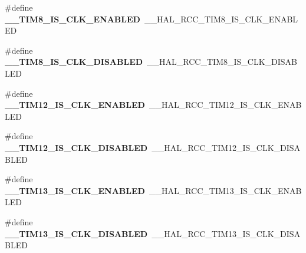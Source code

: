 \begin{DoxyCompactItemize}
\item 
\#define {\bfseries \+\_\+\+\_\+\+T\+I\+M8\+\_\+\+I\+S\+\_\+\+C\+L\+K\+\_\+\+E\+N\+A\+B\+L\+ED}~\+\_\+\+\_\+\+H\+A\+L\+\_\+\+R\+C\+C\+\_\+\+T\+I\+M8\+\_\+\+I\+S\+\_\+\+C\+L\+K\+\_\+\+E\+N\+A\+B\+L\+ED\hypertarget{group___h_a_l___r_c_c___aliased_gaf47e9207e83e8bfdd1ccedca25adb919}{}\label{group___h_a_l___r_c_c___aliased_gaf47e9207e83e8bfdd1ccedca25adb919}

\item 
\#define {\bfseries \+\_\+\+\_\+\+T\+I\+M8\+\_\+\+I\+S\+\_\+\+C\+L\+K\+\_\+\+D\+I\+S\+A\+B\+L\+ED}~\+\_\+\+\_\+\+H\+A\+L\+\_\+\+R\+C\+C\+\_\+\+T\+I\+M8\+\_\+\+I\+S\+\_\+\+C\+L\+K\+\_\+\+D\+I\+S\+A\+B\+L\+ED\hypertarget{group___h_a_l___r_c_c___aliased_gac644d31214f71a4b97900297ce75fbc3}{}\label{group___h_a_l___r_c_c___aliased_gac644d31214f71a4b97900297ce75fbc3}

\item 
\#define {\bfseries \+\_\+\+\_\+\+T\+I\+M12\+\_\+\+I\+S\+\_\+\+C\+L\+K\+\_\+\+E\+N\+A\+B\+L\+ED}~\+\_\+\+\_\+\+H\+A\+L\+\_\+\+R\+C\+C\+\_\+\+T\+I\+M12\+\_\+\+I\+S\+\_\+\+C\+L\+K\+\_\+\+E\+N\+A\+B\+L\+ED\hypertarget{group___h_a_l___r_c_c___aliased_ga0c5637eebc7a41d8e9d9d7ff1fb9deec}{}\label{group___h_a_l___r_c_c___aliased_ga0c5637eebc7a41d8e9d9d7ff1fb9deec}

\item 
\#define {\bfseries \+\_\+\+\_\+\+T\+I\+M12\+\_\+\+I\+S\+\_\+\+C\+L\+K\+\_\+\+D\+I\+S\+A\+B\+L\+ED}~\+\_\+\+\_\+\+H\+A\+L\+\_\+\+R\+C\+C\+\_\+\+T\+I\+M12\+\_\+\+I\+S\+\_\+\+C\+L\+K\+\_\+\+D\+I\+S\+A\+B\+L\+ED\hypertarget{group___h_a_l___r_c_c___aliased_gaaab56663d7cb19bdd60f4e3554b747c7}{}\label{group___h_a_l___r_c_c___aliased_gaaab56663d7cb19bdd60f4e3554b747c7}

\item 
\#define {\bfseries \+\_\+\+\_\+\+T\+I\+M13\+\_\+\+I\+S\+\_\+\+C\+L\+K\+\_\+\+E\+N\+A\+B\+L\+ED}~\+\_\+\+\_\+\+H\+A\+L\+\_\+\+R\+C\+C\+\_\+\+T\+I\+M13\+\_\+\+I\+S\+\_\+\+C\+L\+K\+\_\+\+E\+N\+A\+B\+L\+ED\hypertarget{group___h_a_l___r_c_c___aliased_ga8188c745262e4d7a49becae198d81bc0}{}\label{group___h_a_l___r_c_c___aliased_ga8188c745262e4d7a49becae198d81bc0}

\item 
\#define {\bfseries \+\_\+\+\_\+\+T\+I\+M13\+\_\+\+I\+S\+\_\+\+C\+L\+K\+\_\+\+D\+I\+S\+A\+B\+L\+ED}~\+\_\+\+\_\+\+H\+A\+L\+\_\+\+R\+C\+C\+\_\+\+T\+I\+M13\+\_\+\+I\+S\+\_\+\+C\+L\+K\+\_\+\+D\+I\+S\+A\+B\+L\+ED\hypertarget{group___h_a_l___r_c_c___aliased_ga166d8de45811451c662442f48bcfd5d2}{}\label{group___h_a_l___r_c_c___aliased_ga166d8de45811451c662442f48bcfd5d2}


\end{DoxyCompactItemize}
